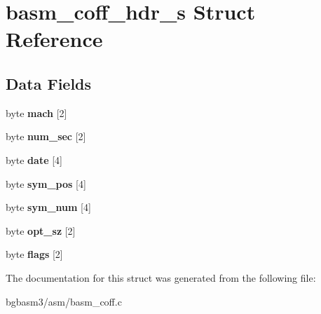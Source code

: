 \hypertarget{structbasm__coff__hdr__s}{\section{basm\-\_\-coff\-\_\-hdr\-\_\-s Struct Reference}
\label{structbasm__coff__hdr__s}
}
\subsection*{Data Fields}
\begin{DoxyCompactItemize}
\item 
\hypertarget{structbasm__coff__hdr__s_a64501077612a24cc71571e3438c7d226}{byte {\bfseries mach} \mbox{[}2\mbox{]}}\label{structbasm__coff__hdr__s_a64501077612a24cc71571e3438c7d226}

\item 
\hypertarget{structbasm__coff__hdr__s_a346e16a19eb1b14cd6ce2bcf86f31202}{byte {\bfseries num\-\_\-sec} \mbox{[}2\mbox{]}}\label{structbasm__coff__hdr__s_a346e16a19eb1b14cd6ce2bcf86f31202}

\item 
\hypertarget{structbasm__coff__hdr__s_a39d095ebe13a7cc48e94e8474d6a3978}{byte {\bfseries date} \mbox{[}4\mbox{]}}\label{structbasm__coff__hdr__s_a39d095ebe13a7cc48e94e8474d6a3978}

\item 
\hypertarget{structbasm__coff__hdr__s_a7d520a20743dfe5aa2c1b477f5e48fcc}{byte {\bfseries sym\-\_\-pos} \mbox{[}4\mbox{]}}\label{structbasm__coff__hdr__s_a7d520a20743dfe5aa2c1b477f5e48fcc}

\item 
\hypertarget{structbasm__coff__hdr__s_ae9ee63680394211fbfd6337180dd89a2}{byte {\bfseries sym\-\_\-num} \mbox{[}4\mbox{]}}\label{structbasm__coff__hdr__s_ae9ee63680394211fbfd6337180dd89a2}

\item 
\hypertarget{structbasm__coff__hdr__s_ad2d008af6ab163b1e99010ae63ac161b}{byte {\bfseries opt\-\_\-sz} \mbox{[}2\mbox{]}}\label{structbasm__coff__hdr__s_ad2d008af6ab163b1e99010ae63ac161b}

\item 
\hypertarget{structbasm__coff__hdr__s_a14eaf95b7b4a54ea517ccd0d20765f15}{byte {\bfseries flags} \mbox{[}2\mbox{]}}\label{structbasm__coff__hdr__s_a14eaf95b7b4a54ea517ccd0d20765f15}

\end{DoxyCompactItemize}


The documentation for this struct was generated from the following file\-:\begin{DoxyCompactItemize}
\item 
bgbasm3/asm/basm\-\_\-coff.\-c\end{DoxyCompactItemize}
